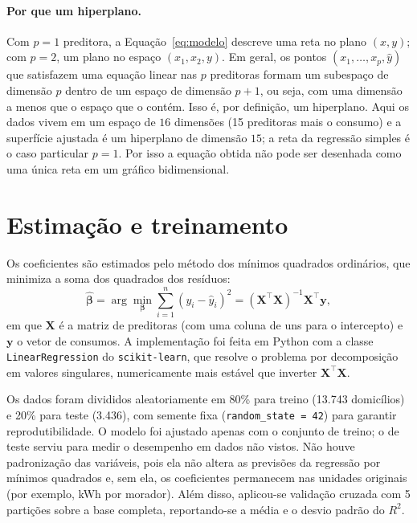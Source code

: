 \paragraph{Por que um hiperplano.} Com $p = 1$ preditora, a
Equação~\eqref{eq:modelo} descreve uma reta no plano $(x, y)$; com $p = 2$,
um plano no espaço $(x_1, x_2, y)$. Em geral, os pontos
$(x_1, \dots, x_p, \hat{y})$ que satisfazem uma equação linear nas $p$
preditoras formam um subespaço de dimensão $p$ dentro de um espaço de
dimensão $p + 1$, ou seja, com uma dimensão a menos que o espaço que o contém.
Isso é, por definição, um hiperplano. Aqui os dados vivem em um espaço de
$16$ dimensões (15 preditoras mais o consumo) e a superfície ajustada é um
hiperplano de dimensão $15$; a reta da regressão simples é o caso particular
$p = 1$. Por isso a equação obtida não pode ser desenhada como uma única reta
em um gráfico bidimensional.

\section{Estimação e treinamento}

Os coeficientes são estimados pelo método dos mínimos quadrados ordinários,
que minimiza a soma dos quadrados dos resíduos:
\begin{equation}
  \hat{\boldsymbol{\beta}} = \arg\min_{\boldsymbol{\beta}}
  \sum_{i=1}^{n} (y_i - \hat{y}_i)^2
  = (\mathbf{X}^{\top}\mathbf{X})^{-1}\mathbf{X}^{\top}\mathbf{y},
  \label{eq:mqo}
\end{equation}
em que $\mathbf{X}$ é a matriz de preditoras (com uma coluna de uns para o
intercepto) e $\mathbf{y}$ o vetor de consumos. A implementação foi feita em
Python com a classe \texttt{LinearRegression} do \texttt{scikit-learn}, que
resolve o problema por decomposição em valores singulares, numericamente mais
estável que inverter $\mathbf{X}^{\top}\mathbf{X}$.

Os dados foram divididos aleatoriamente em 80\% para treino (13.743
domicílios) e 20\% para teste (3.436), com semente fixa
(\texttt{random\_state = 42}) para garantir reprodutibilidade. O modelo foi
ajustado apenas com o conjunto de treino; o de teste serviu para medir o
desempenho em dados não vistos. Não houve padronização das variáveis, pois
ela não altera as previsões da regressão por mínimos quadrados e, sem ela, os
coeficientes permanecem nas unidades originais (por exemplo, kWh por
morador). Além disso, aplicou-se validação cruzada com 5 partições sobre a
base completa, reportando-se a média e o desvio padrão do $R^2$.


